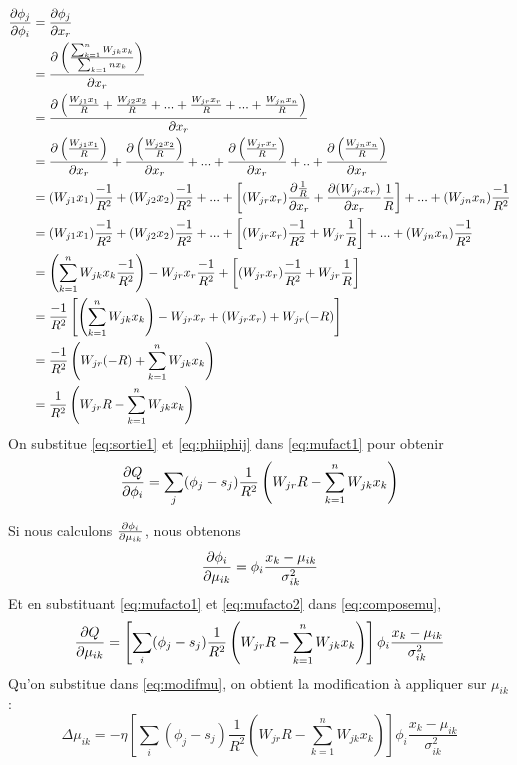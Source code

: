 \begin{equation}\label{eq:phiiphij}
 \begin{split}
 \frac{\partial \phi_j}{\partial \phi_i} & = \frac{\partial \phi_j}{\partial x_r}\\
 ~ & = \frac{\partial \left(\frac{\sum_{k=1}^{n}W_{jk}x_k}{\sum_{k=1}{n}x_k}\right)}{\partial x_r}\\
 ~ & = \frac{\partial \left(\frac{W_{j1}x_1}{R} + \frac{W_{j2}x_2}{R} + ... + \frac{W_{jr}x_r}{R} + ... + \frac{W_{jn}x_n}{R}\right)}{\partial x_r}\\
 ~ & = \frac{\partial \left(\frac{W_{j1}x_1}{R}\right)}{\partial x_r} + \frac{\partial \left(\frac{W_{j2}x_2}{R}\right)}{\partial x_r} + ... + \frac{\partial \left(\frac{W_{jr}x_r}{R}\right)}{\partial x_r} + .. + \frac{\partial \left(\frac{W_{jn}x_n}{R}\right)}{\partial x_r}\\
 ~ & = (W_{j1}x_1)\frac{-1}{R^2} + (W_{j2}x_2)\frac{-1}{R^2} + ... + \left[(W_{jr}x_r)\frac{\partial \frac{1}{R}}{\partial x_r}+\frac{\partial (W_{jr}x_r)}{\partial x_r}\frac{1}{R}\right] + ... + (W_{jn}x_n)\frac{-1}{R^2}\\
 ~ & = (W_{j1}x_1)\frac{-1}{R^2} + (W_{j2}x_2)\frac{-1}{R^2} + ... + \left[(W_{jr}x_r)\frac{-1}{R^2}+W_{jr}\frac{1}{R}\right] + ... + (W_{jn}x_n)\frac{-1}{R^2}\\
 ~ & = \left(\sum_{k=1}^{n}W_{jk}x_k\frac{-1}{R^2}\right)-W_{jr}x_r\frac{-1}{R^2} + \left[(W_{jr}x_r)\frac{-1}{R^2}+W_{jr}\frac{1}{R}\right]\\
 ~ & = \frac{-1}{R^2} \left[\left(\sum_{k=1}^{n}W_{jk}x_k\right)-W_{jr}x_r + (W_{jr}x_r) + W_{jr}(-R)\right]\\
 ~ & = \frac{-1}{R^2} \left(W_{jr}(-R) + \sum_{k=1}^{n}W_{jk}x_k\right)\\
 ~ & = \frac{1}{R^2} \left(W_{jr}R - \sum_{k=1}^{n}W_{jk}x_k\right)
 \end{split}
\end{equation}
On substitue \eqref{eq:sortie1} et \eqref{eq:phiiphij} dans \eqref{eq:mufact1} pour obtenir
\begin{equation}\label{eq:mufacto1}
 \frac{\partial Q}{\partial \phi_i} = \sum_{j} (\phi_j - s_j) \frac{1}{R^2} \left(W_{jr}R - \sum_{k=1}^{n}W_{jk}x_k\right)
\end{equation}

Si nous calculons $\frac{\partial \phi_i}{\partial \mu_{ik}}$, nous obtenons
\begin{equation}\label{eq:mufacto2}
 \frac{\partial \phi_i}{\partial \mu_{ik}} = \phi_i \frac{x_k-\mu_{ik}}{\sigma_{ik}^2}
\end{equation}
Et en substituant \eqref{eq:mufacto1} et \eqref{eq:mufacto2} dans \eqref{eq:composemu},
\[\frac{\partial Q}{\partial \mu_{ik}} = \left[\sum_{i}(\phi_j - s_j) \frac{1}{R^2} \left(W_{jr}R - \sum_{k=1}^{n}W_{jk}x_k\right)\right] \phi_i\frac{x_k-\mu_{ik}}{\sigma_{ik}^2}\]
Qu'on substitue dans \eqref{eq:modifmu}, on obtient la modification à appliquer sur $\mu_{ik}$:
\[\Delta\mu_{ik} = -\eta \left[\sum_{i}(\phi_j - s_j) \frac{1}{R^2} \left(W_{jr}R - \sum_{k=1}^{n}W_{jk}x_k\right)\right] \phi_i\frac{x_k-\mu_{ik}}{\sigma_{ik}^2}\]

